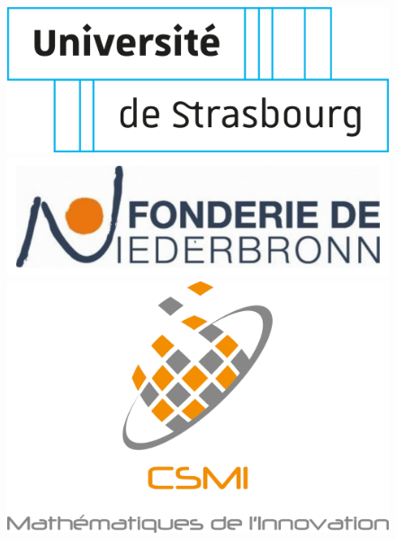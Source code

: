\documentclass[12pt]{article}
\begin{document}
\begin{titlepage}
\title{}
\author{Congo Job
\\ Stage Master 2 \\
 IRMA, Université de Strasbourg, France}
\date{ }

\begin{figure}[b!]
\centering
\vfill
\includegraphics[scale=0.16]{Images/Presentation/logo-unistra.pdf}
\hspace{0.5 cm}
\includegraphics[scale=0.16]{Images/Presentation/logo-Fonderie.pdf}
\hspace{0.5 cm}
\includegraphics[scale=0.16]{Images/Presentation/logoCSMI.pdf}
\end{figure}
\end{titlepage}


\maketitle
\thispagestyle{empty}
\end{document}
